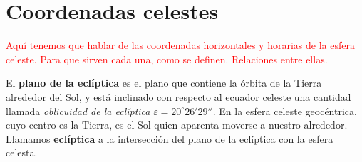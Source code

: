 \section{Coordenadas celestes}

\begin{Anotacion}
	\textcolor{red}{Aquí tenemos que hablar de las coordenadas horizontales y horarias de la esfera celeste. Para que sirven cada una, como se definen. Relaciones entre ellas.}
\end{Anotacion}	



El \textbf{plano de la eclíptica} es el plano que contiene la órbita de la Tierra alrededor del Sol, y está inclinado con respecto al ecuador celeste una cantidad llamada \textit{oblicuidad de la eclíptica} $\varepsilon=20^\circ 26'29''$. En la esfera celeste geocéntrica, cuyo centro es la Tierra, es el Sol quien aparenta moverse a nuestro alrededor. Llamamos \textbf{eclíptica} a la intersección del plano de la eclíptica con la esfera celesta.


